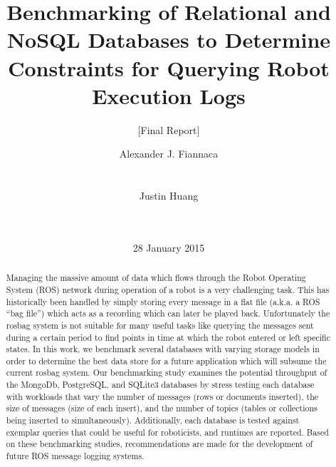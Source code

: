 \documentclass[nocopyrightspace]{acm_proc_article-sp}
\begin{document}
\title{Benchmarking of Relational and NoSQL Databases to Determine Constraints for Querying Robot Execution Logs}
\subtitle{[Final Report]}


\author{
\alignauthor
Alexander J. Fiannaca\\
       \\
       \\
\alignauthor
Justin Huang\\
       \\
       \\
}

\date{28 January 2015}

\maketitle

\begin{abstract}
Managing the massive amount of data which flows through the Robot Operating System (ROS) network during operation of a robot is a very challenging task. This has historically been handled by simply storing every message in a flat file (a.k.a. a ROS ``bag file'') which acts as a recording which can later be played back. Unfortunately the rosbag system is not suitable for many useful tasks like querying the messages sent during a certain period to find points in time at which the robot entered or left specific states. In this work, we benchmark several databases with varying storage models in order to determine the best data store for a future application which will subsume the current rosbag system. Our benchmarking study examines the potential throughput of the MongoDb, PostgreSQL, and SQLite3 databases by stress testing each database with workloads that vary the number of messages (rows or documents inserted), the size of messages (size of each insert), and the number of topics (tables or collections being inserted to simultaneously). Additionally, each database is tested against exemplar queries that could be useful for roboticists, and runtimes are reported. Based on these benchmarking studies, recommendations are made for the development of future ROS message logging systems.
\end{abstract}

\end{document}
